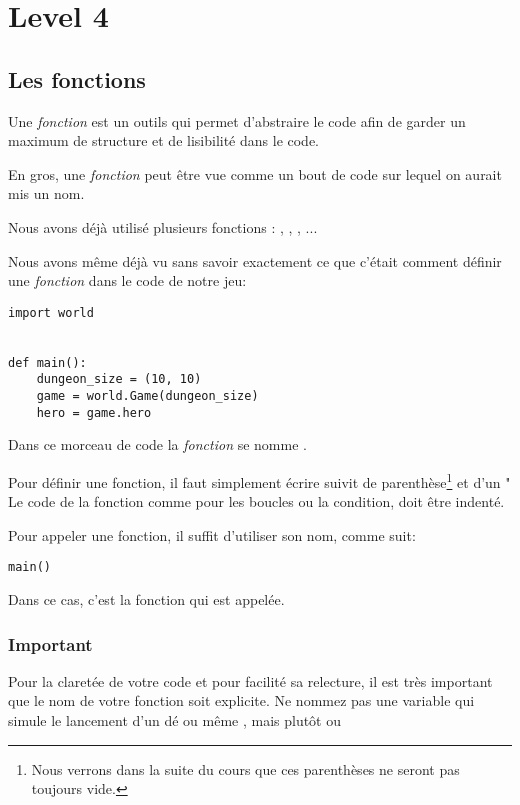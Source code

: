 \chapter{Level 4}

\section{Les fonctions}

Une \emph{fonction} est un outils qui permet d'abstraire le code afin de garder un maximum de structure et de lisibilité dans le code.

En gros, une \emph{fonction} peut être vue comme un bout de code sur lequel on aurait mis un nom.

Nous avons déjà utilisé plusieurs fonctions : , , , ...

Nous avons même déjà vu sans savoir exactement ce que c'était comment définir une \emph{fonction} dans le code de notre jeu:


\begin{lstlisting}
import world


def main():
    dungeon_size = (10, 10)
    game = world.Game(dungeon_size)
    hero = game.hero
\end{lstlisting}

Dans ce morceau de code la \emph{fonction} se nomme .

Pour définir une fonction, il faut simplement écrire  suivit de parenthèse\footnote{Nous verrons dans la suite du cours que ces parenthèses ne seront pas toujours vide.} et d'un "\codeintext{:}
Le code de la fonction comme pour les boucles ou la condition, doit être indenté.

Pour appeler une fonction, il suffit d'utiliser son nom, comme suit:

\begin{lstlisting}
main()
\end{lstlisting}

Dans ce cas, c'est la fonction  qui est appelée.

\subsection{Important}
Pour la claretée de votre code et pour facilité sa relecture, il est très important que le nom de votre fonction soit explicite.
Ne nommez pas une variable qui simule le lancement d'un dé  ou même , mais plutôt  ou 

